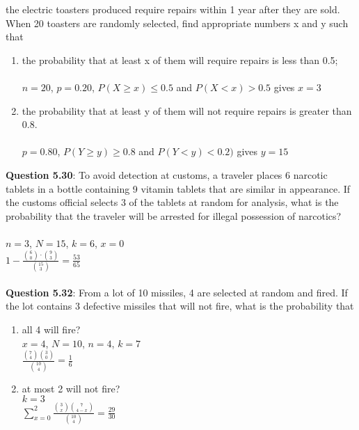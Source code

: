 \documentclass{article}
\begin{document}
    the electric toasters produced require repairs within 1
    year after they are sold. When 20 toasters are randomly 
    selected, find appropriate numbers x and y such
    that
        \begin{enumerate}[label = (\alph*)]
            \item the probability that at least x of them will require repairs is less than 0.5;\\\\
                \indent $n = 20$, $p = 0.20$, $P(X\geq x)\leq 0.5$ and $P(X<x)>0.5$ gives $x=3$
            \item  the probability that at least y of them will not require repairs is greater than 0.8.\\\\
                \indent $p=0.80$, $P(Y\geq y)\geq 0.8$ and $P(Y<y)<0.2)$ gives $y=15$
        \end{enumerate}
    \textbf{Question 5.30}: To avoid detection at customs, a traveler places
    6 narcotic tablets in a bottle containing 9 vitamin
    tablets that are similar in appearance. If the customs
    official selects 3 of the tablets at random for analysis,
    what is the probability that the traveler will be arrested
    for illegal possession of narcotics?\\\\
        \indent $n=3$, $N = 15$, $k = 6$, $x=0$\\
        \indent $1 - \frac{\binom{6}{0}\cdot \binom{9}{3}}{\binom{15}{3}} = \frac{53}{65} $\\\\
    \textbf{Question 5.32}: From a lot of 10 missiles, 4 are selected at random
    and fired. If the lot contains 3 defective missiles
    that will not fire, what is the probability that
        \begin{enumerate}[label = (\alph*)]
            \item all 4 will fire?\\
                \indent $x=4$, $N=10$, $n=4$, $k=7$\\
                \indent $\frac{\binom{7}{4}\binom{3}{0}}{\binom{10}{4}} = \frac{1}{6}$
            \item at most 2 will not fire?\\
                \indent $k = 3$\\
                \indent $\sum_{x=0}^{2}\frac{\binom{3}{x}\binom{7}{4-x}}{\binom{10}{4}} = \frac{29}{30}$
        \end{enumerate}
\end{document}
